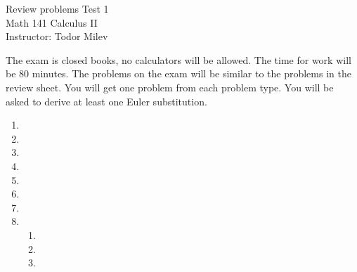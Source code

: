 \documentclass{article}
\begin{document}
\begin{center}
\Large
Review problems Test 1\\ Math 141 Calculus II \\ \normalsize Instructor: Todor Milev
\end{center}


\noindent The exam is closed books, no calculators will be allowed. The time for work will be 80 minutes. The problems on the exam will be similar to the problems in the review sheet. You will get one problem from each problem type. You will be asked to derive at least one Euler substitution.

\begin{enumerate}
\item 
\item 

\item 
\item 
\item 

\item 

\item 
\item \begin{enumerate} 
\item 
\item 
\item 
\end{enumerate}
\end{enumerate}
\end{document}
